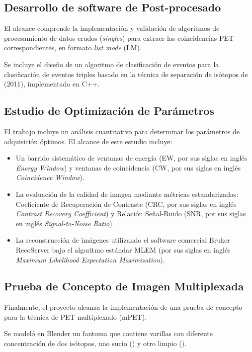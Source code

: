 \subsection{Desarrollo de software de Post-procesado}

El alcance comprende la implementación y validación de algoritmos de procesamiento de datos
crudos (\emph{singles}) para extraer las coincidencias PET correspondientes, en formato \emph{list mode} (LM).


Se incluye el diseño de un algoritmo de clasificación de eventos para la clasificación
de eventos triples basado en la técnica de separación
de isótopos de \citeauthor{Andreyev2011} (2011), implementado en C++.

\subsection{Estudio de Optimización de Parámetros}

El trabajo incluye un análisis cuantitativo para determinar los parámetros de adquisición óptimos.
El alcance de este estudio incluye:
\begin{itemize}
	\item Un barrido sistemático de ventanas de energía (EW, por sus siglas en inglés \emph{Energy Window}) y ventanas de coincidencia (CW, por sus siglas en inglés \emph{Coincidence Window}).
	\item La evaluación de la calidad de imagen mediante métricas estandarizadas: Coeficiente de Recuperación de Contraste (CRC, por sus siglas en inglés \emph{Contrast Recovery Coefficient}) y Relación Señal-Ruido (SNR, por sus siglas en inglés \emph{Signal-to-Noise Ratio}).
	\item La reconstrucción de imágenes utilizando el software comercial Bruker RecoServer bajo el algoritmo estándar MLEM (por sus siglas en inglés \emph{Maximum Likelihood Expectation Maximization}).
\end{itemize}


\subsection{Prueba de Concepto de Imagen Multiplexada}

Finalmente, el proyecto alcanza la implementación de una prueba de concepto para la técnica de PET
multiplexado (mPET).

Se modeló en Blender un fantoma que contiene varillas con diferente concentración de dos isótopos, uno sucio (\yochoseis) y otro limpio (\fdiezocho).

